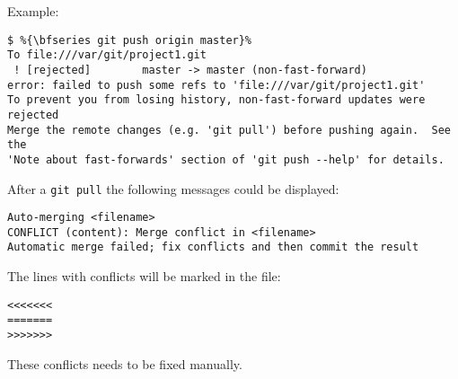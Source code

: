 Example:
\begin{lstlisting}[escapechar=\%]
$ %{\bfseries git push origin master}%
To file:///var/git/project1.git
 ! [rejected]        master -> master (non-fast-forward)
error: failed to push some refs to 'file:///var/git/project1.git'
To prevent you from losing history, non-fast-forward updates were rejected
Merge the remote changes (e.g. 'git pull') before pushing again.  See the
'Note about fast-forwards' section of 'git push --help' for details.
\end{lstlisting}
\newslide
After a \verb|git pull| the following messages could be displayed:
\begin{lstlisting}
Auto-merging <filename>
CONFLICT (content): Merge conflict in <filename>
Automatic merge failed; fix conflicts and then commit the result
\end{lstlisting}
The lines with conflicts will be marked in the file:
\begin{lstlisting}
<<<<<<<
=======
>>>>>>>
\end{lstlisting}
These conflicts needs to be fixed manually.
%
\newslide

%
%
%
%
%

%
\newslide
